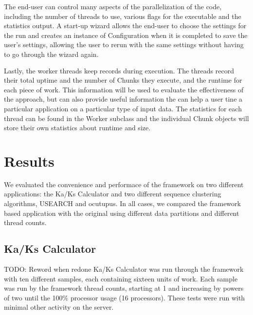 \documentclass[12pt]{article}
\begin{document}
The end-user can control many aspects of the parallelization of the code,
including the number of threads to use, various flags for the executable and the
statistics output.  A start-up wizard allows the end-user to choose the settings
for the run and creates an instance of Configuration when it is completed to
save the user's settings, allowing the user to rerun with the same settings
without having to go through the wizard again.

Lastly, the worker threads keep records during execution. The threads record
their total uptime and the number of Chunks they execute, and the runtime for
each piece of work. This information will be used to evaluate the effectiveness
of the approach, but can also provide useful information the can help a user
tine a particular application on a particular type of input data. The statistics
for each thread can be found in the Worker subclass and the individual Chunk
objects will store their own statistics about runtime and size.

\section{Results}

We evaluated the convenience and performace of the framework on two different
applications: the Ka/Ks Calculator and two different sequence clustering
algorithms, USEARCH and ocutupus. In all cases, we compared the framework based
application with the original using different data partitions and different
thread counts.

\subsection{Ka/Ks Calculator}
TODO: Reword when redone
Ka/Ks Calculator was run through the framework with ten different samples, each
containing sixteen units of work. Each sample was run by the framework thread
counts, starting at 1 and increasing by powers of two until the 100\% processor
usage (16 processors). These tests were run with minimal other activity on the
server.
\end{document}
